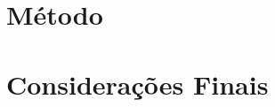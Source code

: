 \documentclass[
12pt,             %
a4paper,          %
article,          %
oneside,          %
english,          %
brazil            %
]{abntex2}
\begin{document}
\section{Método}
\label{sec:metodo}




\section{Considerações Finais}
\label{sec:consideracoes}




\end{document}
